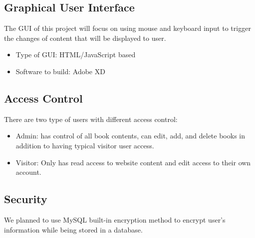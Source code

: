 \documentclass[titlepage]{article}
\begin{document}
	\subsection{Graphical User Interface}
	The GUI of this project will focus on using mouse and keyboard input to trigger the changes of content that will be displayed to user.
	\begin{itemize}
		\item Type of GUI: HTML/JavaScript based
		\item Software to build: Adobe XD
	\end{itemize}
	\subsection{Access Control}
	There are two type of users with different access control:
	\begin{itemize}
		\item Admin: has control of all book contents, can edit, add, and delete books in addition to having typical visitor user access.
		\item Visitor: Only has read access to website content and edit access to their own account.
	\end{itemize}
	\subsection{Security}
	We planned to use MySQL built-in encryption method to encrypt user's information while being stored in a database.
\end{document}
